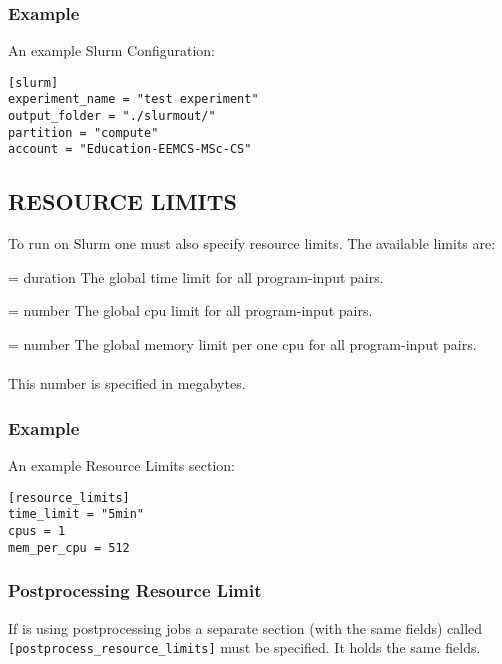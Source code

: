 \documentclass[a4paper,english]{article}
\begin{document}
\begin{adjustwidth}{18pt}{0pt}
          \subsubsection{Example}
              An example Slurm Configuration:

              \begin{verbatim}
[slurm]
experiment_name = "test experiment"
output_folder = "./slurmout/"
partition = "compute"
account = "Education-EEMCS-MSc-CS"
              \end{verbatim}

      \subsection{RESOURCE LIMITS}

          To run on Slurm one must also specify resource limits.
          The available limits are:

          \begin{Description}[Options]\setlength{\itemsep}{0cm}
              \item[\Opt{time\_limit} = duration]
                The global time limit for all program-input pairs.
              \item[\Opt{cpu\_limit} = number]
                The global cpu limit for all program-input pairs.
              \item[\Opt{mem\_per\_cpu} = number]
                The global memory limit per one cpu for all program-input pairs. \\ \\
                This number is specified in megabytes.
          \end{Description}


          \subsubsection{Example}
              An example Resource Limits section:

              \begin{verbatim}
[resource_limits]
time_limit = "5min"
cpus = 1
mem_per_cpu = 512
              \end{verbatim}

          \subsubsection{Postprocessing Resource Limit}

              If  is using postprocessing jobs a separate section
              (with the same fields) called \\
              \texttt{[postprocess\_resource\_limits]} must be specified.
              It holds the same fields.


\end{adjustwidth}
\end{document}
